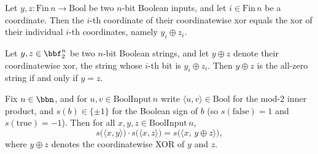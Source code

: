 \begin{lemma}
\label{CommunicationComplexity.Functions.InnerProduct.xorInput_apply}
\leanok
{}
Let $y, z \colon \mathrm{Fin}\,n \to \mathrm{Bool}$ be two $n$-bit Boolean inputs, and
let $i \in \mathrm{Fin}\,n$ be a coordinate. Then the $i$-th coordinate of their
coordinatewise xor equals the xor of their individual $i$-th coordinates, namely $y_i
\oplus z_i$.
\end{lemma}

\begin{lemma}
\label{CommunicationComplexity.Functions.InnerProduct.xorInput_eq_zeroInput_iff}
\leanok
{}
Let $y, z \in \bbf_2^n$ be two $n$-bit Boolean strings, and let $y \oplus z$ denote
their coordinatewise xor, the string whose $i$-th bit is $y_i \oplus z_i$. Then $y
\oplus z$ is the all-zero string if and only if $y = z$.
\end{lemma}

\begin{lemma}
\label{CommunicationComplexity.Functions.InnerProduct.boolSign_innerProduct_mul_eq_xorInput}
\leanok
{}
Fix $n \in \bbn$, and for $u,v \in \mathrm{BoolInput}\,n$ write $\langle u, v\rangle \in
\mathrm{Bool}$ for the mod-$2$ inner product, and $s(b) \in \{\pm 1\}$ for the Boolean
sign of $b$ (so $s(\mathrm{false}) = 1$ and $s(\mathrm{true}) = -1$). Then for all $x,
y, z \in \mathrm{BoolInput}\,n$,
\[
  s\big(\langle x, y\rangle\big)\cdot s\big(\langle x, z\rangle\big)
  = s\big(\langle x,\, y \oplus z\rangle\big),
\]
where $y \oplus z$ denotes the coordinatewise XOR of $y$ and $z$.
\end{lemma}

